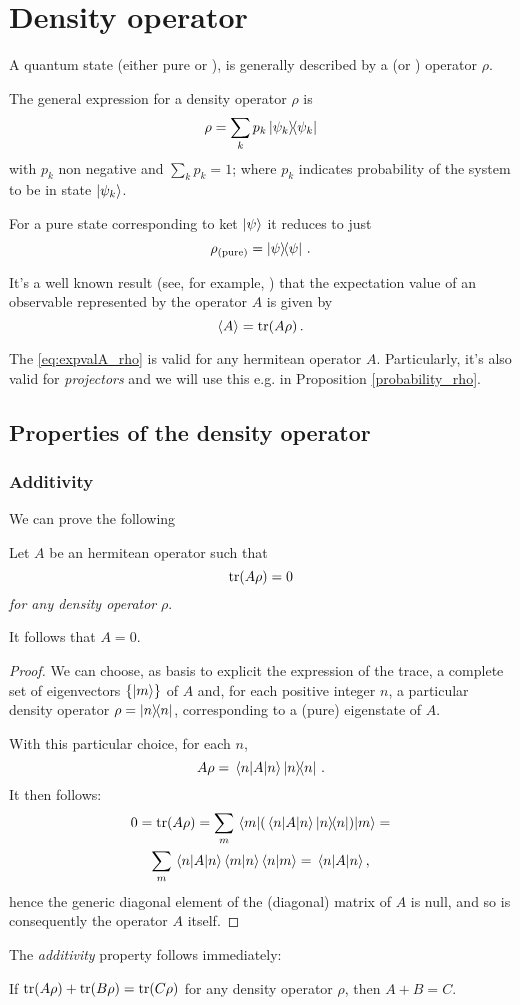 \section{Density operator}\label{app:density}

A quantum state (either pure or ),
is generally described by a  (or ) operator $\rho$.

The general expression for a density operator $\rho$ is
$$
  \rho = \sum_{k}p_{k}\ketbra{\psi_{k}}
$$
with $p_{k}$ non negative and $\sum_{k}p_{k} = 1$;
where $p_k$ indicates probability of the system to be in state $\ket{\psi_{k}}$.

For a pure state corresponding to ket $\ket{\psi}$ it reduces to just
\[
  \rho_{(\text{pure})} = \ketbra{\psi}\,\text{.}
\]

It's a well known result (see, for example, \cite{open_systems})
that the expectation value of an observable represented by the operator $A$
is given by
\begin{equation}\label{eq:expvalA_rho}
  \expval{A} = \tr(A\rho)\,.
\end{equation}

The \eqref{eq:expvalA_rho} is valid for any hermitean operator $A$. Particularly,
it's also valid for \emph{projectors} and we will use this
e.g. in Proposition \ref{probability_rho}.

\subsection{Properties of the density operator}
\subsubsection{Additivity}


We can prove the following
\begin{proposition}
  Let $A$ be an hermitean operator such that
  $$
    \tr(A\rho) = 0 
  $$
  \emph{for any density operator} $\rho$.

  It follows that $A = 0$.

  \begin{proof}
    We can choose,
    as basis to explicit the expression of the trace,
    a complete set of eigenvectors $\{\ket{m}\}$ of $A$ and,
    for each positive integer $n$,
    a particular density operator $\rho = \ketbra{n}$,
    corresponding to a (pure) eigenstate of $A$.

    With this particular choice,
    for each $n$,
    $$
      A\rho = \mel{n}{A}{n}\ketbra{n}\,.
    $$
    It then follows:
    \begin{multline*}
      0 = \tr(A\rho) = \sum_{m}\mel{m}{ ( \mel{n}{A}{n}\ketbra{n} ) }{m} = \\
          \sum_{m} \mel{n}{A}{n} \braket{m}{n} \braket{n}{m}
        = \mel{n}{A}{n} ,
    \end{multline*}
    hence the generic diagonal element of the (diagonal) matrix of $A$ is null,
    and so is consequently the operator $A$ itself.
  \end{proof}
\end{proposition}

The \emph{additivity} property follows immediately:

\begin{corollary}
If $\tr(A\rho) + \tr(B\rho) = \tr(C\rho)$ for any density operator $\rho$,
then $A + B = C$.
\end{corollary}

